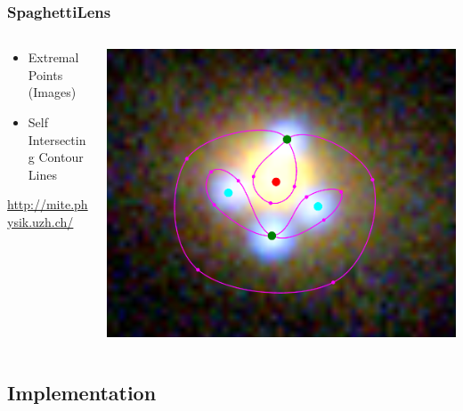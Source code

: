 \documentclass[aspectratio=1610]{beamer}
\begin{document}
\begin{frame}
  \frametitle{SpaghettiLens}

  \begin{columns}[c]\begin{column}{0.55\textwidth}
    \begin{itemize}
    \item Extremal Points (Images)
    \item Self Intersecting Contour Lines
    \end{itemize}
    \url{http://mite.physik.uzh.ch/}

  \end{column}\begin{column}{0.44\textwidth}
    \includegraphics[width=\textwidth]{imgs/sled-1}
  \end{column}\end{columns}


\end{frame}

\subsection{Implementation}
\end{document}
